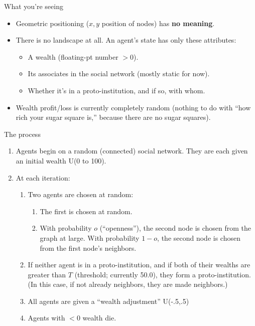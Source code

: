 \documentclass[12pt]{beamer}
\author{Stephen Davies}
\newcommand{\freakingtilde}{\raisebox{0.5ex}{\texttildelow}}
\begin{document}
\begin{frame}[c]{What you're seeing}

\begin{itemize}
\pause
\item Geometric positioning ($x,y$ position of nodes) has \textbf{no meaning}.
\pause
\item There is no landscape at all. An agent's state has only these attributes:
    \begin{itemize}
    \item A wealth (floating-pt number $> 0$).
    \item Its associates in the social network (mostly static for now).
    \item Whether it's in a proto-institution, and if so, with whom.
    \end{itemize}

\pause
\item Wealth profit/loss is currently completely random (nothing to do with
``how rich your sugar square is,'' because there are no sugar squares).
\end{itemize}

\end{frame}

\begin{frame}[c]{The process}

\begin{enumerate}
\small
\item Agents begin on a random (connected) social network. They are each given
an initial wealth \freakingtilde U(0 to 100).

\pause
\item At each iteration:

    \begin{enumerate}
    \item Two agents are chosen at random:

        \begin{enumerate}
        \item The first is chosen at random.
        \item With probability $o$ (``openness''), the second node is chosen
from the graph at large. With probability $1-o$, the second node is chosen from
the first node's neighbors.
        \end{enumerate}

\pause
    \item If neither agent is in a proto-institution, and if both of their
wealths are greater than $T$ (threshold; currently 50.0), they form a
proto-institution. (In this case, if not already neighbors, they are made
neighbors.)

\pause
    \item All agents are given a ``wealth adjustment'' \freakingtilde
U(-.5,.5)

\pause
    \item Agents with $< 0$ wealth die.
    \end{enumerate}

\end{enumerate}

\end{frame}
\end{document}
